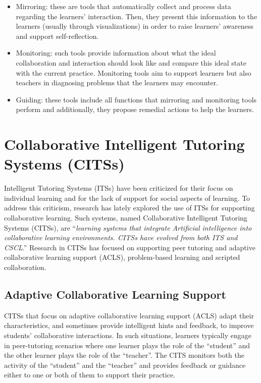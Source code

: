 \documentclass[
]{book}
\providecommand{\tightlist}{%
  \setlength{\itemsep}{0pt}\setlength{\parskip}{0pt}}
\begin{document}
\begin{itemize}
\tightlist
\item
  Mirroring: these are tools that automatically collect and process data regarding the learners' interaction. Then, they present this information to the learners (usually through visualizations) in order to raise learners' awareness and support self-reflection.
\item
  Monitoring: such tools provide information about what the ideal collaboration and interaction should look like and compare this ideal state with the current practice. Monitoring tools aim to support learners but also teachers in diagnosing problems that the learners may encounter.\\
\item
  Guiding: these tools include all functions that mirroring and monitoring tools perform and additionally, they propose remedial actions to help the learners.
\end{itemize}

\section{Collaborative Intelligent Tutoring Systems (CITSs)}\label{collaborative-intelligent-tutoring-systems-citss}

Intelligent Tutoring Systems (ITSs) have been criticized for their focus on individual learning and for the lack of support for social aspects of learning. To address this criticism, research has lately explored the use of ITSs for supporting collaborative learning. Such systems, named Collaborative Intelligent Tutoring Systems (CITSs), are
``\emph{learning systems that integrate Artificial intelligence into
collaborative learning environments. CITSs have evolved from
both ITS and CSCL}.'' \citep{ubani2022review} Research in CITSs has focused on supporting peer tutoring and adaptive collaborative learning support (ACLS), problem-based learning and scripted collaboration.

\subsection{Adaptive Collaborative Learning Support}\label{adaptive-collaborative-learning-support}

CITSs that focus on adaptive collaborative learning support (ACLS) adapt their characteristics, and sometimes provide intelligent hints and feedback, to improve students' collaborative interactions. In such situations, learners typically engage in peer-tutoring scenarios where one learner plays the role of the ``student'' and the other learner plays the role of the ``teacher''. The CITS monitors both the activity of the ``student'' and the ``teacher'' and provides feedback or guidance either to one or both of them to support their practice.
\end{document}
